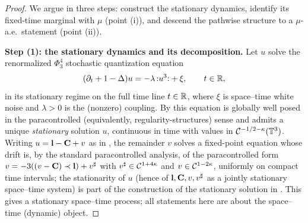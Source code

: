 \begin{proof}
We argue in three steps: construct the stationary dynamics, identify its
fixed-time marginal with $\mu$ (point (i)), and descend the pathwise structure to
a $\mu$-a.e.\ statement (point (ii)).

\medskip
\textbf{Step (1): the stationary dynamics and its decomposition.}
Let $u$ solve the renormalized $\Phi^4_3$ stochastic quantization equation
\begin{equation}\label{eq:sqe}
(\partial_t+1-\Delta)u=-\lambda\,{:}u^3{:}+\xi ,\qquad t\in\mathbb{R},
\end{equation}
in its stationary regime on the full time line $t\in\mathbb{R}$, where $\xi$ is
space--time white noise and $\lambda>0$ is the (nonzero) coupling. By
\cite{HM18,CC18,EW24} this equation is globally well posed in the
paracontrolled (equivalently, regularity-structures) sense and admits a unique
\emph{stationary} solution $u$, continuous in time with values in
$\mathcal{C}^{-1/2-\kappa}(\mathbb{T}^3)$. Writing $u=\mathbf{l}-\mathbf{C}+v$ as in \cite{CC18}, the
remainder $v$ solves a fixed-point equation whose drift is, by the standard
paracontrolled analysis, of the para\-controlled form
$v=-3((v-\mathbf{C})\prec\mathbf{l})+v^\sharp$ with $v^\sharp\in\mathcal{C}^{1+4\kappa}$ and
$v\in\mathcal{C}^{1-2\kappa}$, uniformly on compact time intervals; the stationarity of
$u$ (hence of $\mathbf{l},\mathbf{C},v,v^\sharp$ as a jointly stationary space--time
system) is part of the construction of the stationary solution in \cite{EW24}.
This gives a stationary space--time process; all statements here are about the
space--time (dynamic) object.


\end{proof}
